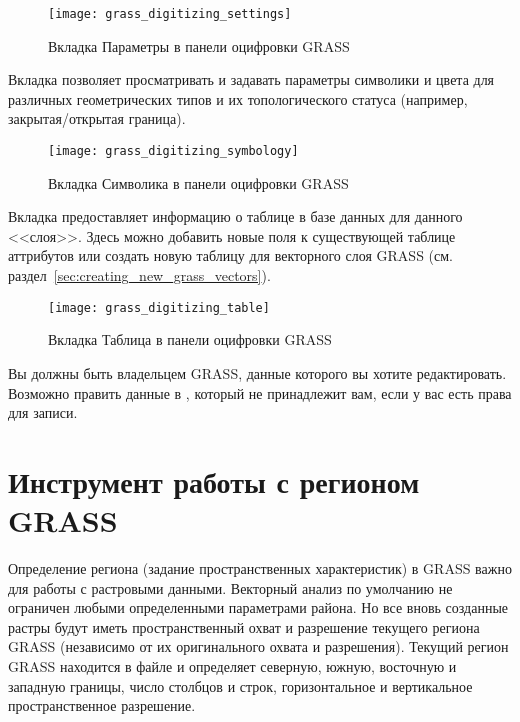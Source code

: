 \begin{figure}[h]
 \centering
 \texttt{[image: grass\_digitizing\_settings]}
 \caption{Вкладка Параметры в панели оцифровки GRASS \nixcaption}\label{fig:grass_digitizing_settings}
\end{figure}


Вкладка  позволяет просматривать и задавать параметры
символики и цвета для различных геометрических типов и их
топологического статуса (например, закрытая/открытая граница).

\begin{figure}[h]
 \centering
 \texttt{[image: grass\_digitizing\_symbology]}
 \caption{Вкладка Символика в панели оцифровки GRASS \nixcaption}\label{fig:grass_digitizing_symbology}
\end{figure}

 
Вкладка  предоставляет информацию о таблице в базе данных
для данного <<слоя>>. Здесь можно добавить новые поля к существующей
таблице аттрибутов или создать новую таблицу для векторного слоя GRASS
(см. раздел~\ref{sec:creating_new_grass_vectors}).

\begin{figure}[h]
 \centering
 \texttt{[image: grass\_digitizing\_table]}
 \caption{Вкладка Таблица в панели оцифровки GRASS \nixcaption}\label{fig:grass_digitizing_table}
 \end{figure}

\begin{Tip}\caption{\textsc{Права редактирования GRASS}}
Вы должны быть владельцем  GRASS, данные которого вы
хотите редактировать. Возможно править данные в ,
который не принадлежит вам, если у вас есть права для записи.
\end{Tip}

\section{Инструмент работы с регионом GRASS}\label{sec:grass_region}

Определение региона (задание пространственных характеристик) в GRASS
важно для работы с растровыми данными. Векторный анализ по умолчанию не
ограничен любыми определенными параметрами района. Но все вновь
созданные растры будут иметь пространственный охват и разрешение
текущего региона GRASS (независимо от их оригинального охвата и
разрешения). Текущий регион GRASS находится в файле
 и определяет северную, южную,
восточную и западную границы, число столбцов и строк, горизонтальное и
вертикальное пространственное разрешение.

